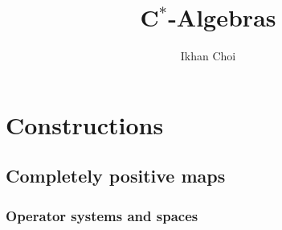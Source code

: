 \documentclass{../../large}
\begin{document}
\title{C$^*$-Algebras}
\author{Ikhan Choi}
\maketitle
\tableofcontents

\part{Constructions}


\chapter{Completely positive maps}
\section{Operator systems and spaces}


\begin{prb}

\end{prb}

\begin{prb}
\end{prb}
\end{document}
